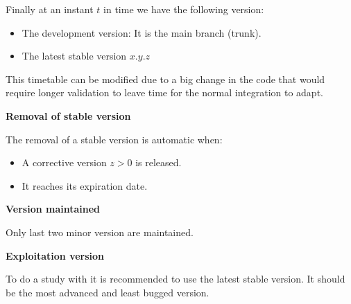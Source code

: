 Finally at an instant $t$ in time we have the following version:
\begin{itemize}
\item The development version: It is the main branch (trunk).
\item The latest stable version $x.y.z$
\end{itemize}

This timetable can be modified due to a big change in the code that would
require longer validation to leave time for the normal integration to adapt.

\textbf{Removal of stable version}

The removal of a stable version is automatic when:
\begin{itemize}
\item A corrective version $z > 0$ is released.
\item It reaches its expiration date. 
\end{itemize}

\textbf{Version maintained}

Only last two minor version are maintained.

\textbf{Exploitation version}

To do a study with \telemacsystem it is recommended to use the latest stable version.
It should be the most advanced and least bugged version.
